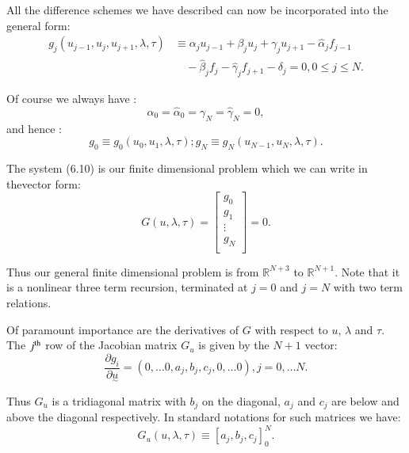 All the difference schemes we have described can now be incorporated
into the general form: 
\begin{align*}
g_j(u_{j-1},u_j,u_{j+1},\lambda,\tau ) & \equiv \alpha_j u_{j-1} +
\beta_j u_j + \gamma_j u_{j+1}-\hat{\alpha}_jf_{j-1}\\
& \quad -\hat{\beta}_j
f_{j}-\hat{\gamma}_j f_{j+1} -\delta_j = 0, 0 \leq j \leq
N.\tag{6.10a} \label{chap6-eq6.10a} 
\end{align*}

Of course we always have :
\begin{equation*}
\alpha_0 = \hat{\alpha}_0 = \gamma_N = \hat{\gamma}_N = 0,\tag{6.10b}
\label{chap6-eq6.10b} 
\end{equation*}
and hence :
\begin{equation*}
g_0 \equiv g_0 (u_0,u_1,\lambda,\tau) ; g_N \equiv
g_N(u_{N-1},u_N,\lambda,\tau).\tag{6.10c} \label{chap6-eq6.10c}
\end{equation*}

The system (6.10) is our finite dimensional problem which we can
write in the\pageoriginale vector form: 
\begin{equation*}
G(u,\lambda,\tau) = 
\begin{bmatrix}
g_0\\
g_1\\
\vdots\\
g_N\\
\end{bmatrix}
= 0 .
\end{equation*}

Thus our general finite dimensional problem is from $\mathbb{R}^{N+3}$
to $\mathbb{R}^{N+1}$. Note that it is a nonlinear three term
recursion, terminated at $j = 0$ and $j = N$ with two term relations. 

Of paramount importance are the derivatives of $G$ with respect to
$u$, $\lambda$ and $\tau$. The $j^{\rm th}$ row of the Jacobian matrix $G_u$ is
given by the $N+1$ vector: 
$$
\frac{\partial g_i}{\partial \underset{\sim}{u}} = (0,\ldots
0,a_j,b_j,c_j,0,\ldots 0), j = 0, \ldots N. 
$$

Thus $G_u$ is a tridiagonal matrix with $b_j$ on the diagonal, $a_j$
and $c_j$ are below and above the diagonal respectively. In standard
notations for such matrices we have:  
\begin{equation*}
G_u(u,\lambda,\tau ) \equiv [a_j,b_j,c_j]^N_0.\tag{6.11}\label{chap6-eq6.11}
\end{equation*}

